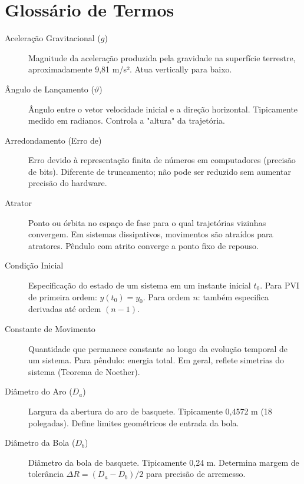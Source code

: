 \documentclass[12pt,a4paper]{article}
\begin{document}
\newpage


\section{Glossário de Termos}

\begin{description}
    \item[Aceleração Gravitacional ($g$)] Magnitude da aceleração produzida pela gravidade na superfície terrestre, aproximadamente 9,81 m/s². Atua vertically para baixo.
    
    \item[Ângulo de Lançamento ($\vartheta$)] Ângulo entre o vetor velocidade inicial e a direção horizontal. Tipicamente medido em radianos. Controla a "altura" da trajetória.
    
    \item[Arredondamento (Erro de)] Erro devido à representação finita de números em computadores (precisão de bits). Diferente de truncamento; não pode ser reduzido sem aumentar precisão do hardware.
    
    \item[Atrator] Ponto ou órbita no espaço de fase para o qual trajetórias vizinhas convergem. Em sistemas dissipativos, movimentos são atraídos para atratores. Pêndulo com atrito converge a ponto fixo de repouso.
    
    \item[Condição Inicial] Especificação do estado de um sistema em um instante inicial $t_0$. Para PVI de primeira ordem: $y(t_0) = y_0$. Para ordem $n$: também especifica derivadas até ordem $(n-1)$.
    
    \item[Constante de Movimento] Quantidade que permanece constante ao longo da evolução temporal de um sistema. Para pêndulo: energia total. Em geral, reflete simetrias do sistema (Teorema de Noether).
    
    \item[Diâmetro do Aro ($D_a$)] Largura da abertura do aro de basquete. Tipicamente 0,4572 m (18 polegadas). Define limites geométricos de entrada da bola.
    
    \item[Diâmetro da Bola ($D_b$)] Diâmetro da bola de basquete. Tipicamente 0,24 m. Determina margem de tolerância $\Delta R = (D_a - D_b)/2$ para precisão de arremesso.
    

\end{description}
\end{document}
